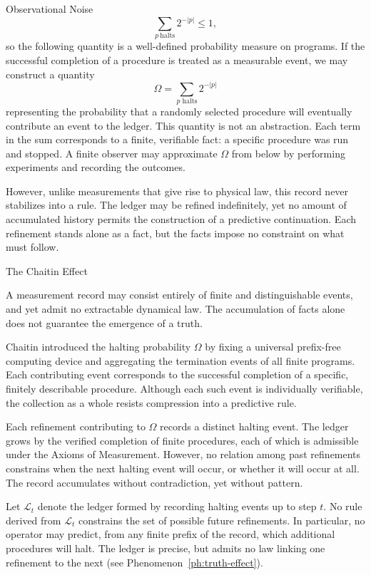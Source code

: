 \begin{coda}{Observational Noise}
\begin{equation}
\sum_{p\ \text{halts}} 2^{-|p|}\le 1,
\end{equation}
so the following quantity is a
well-defined probability measure on programs.
If the successful completion of a procedure is treated as a measurable
event, we may construct a quantity
\begin{equation}
\Omega = \sum_{p \text{ halts}} 2^{-|p|}
\end{equation}
representing the probability that a randomly selected procedure will
eventually contribute an event to the ledger. This quantity is not an
abstraction. Each term in the sum corresponds to a finite, verifiable
fact: a specific procedure was run and stopped. A finite observer may
approximate $\Omega$ from below by performing experiments and recording
the outcomes. 

However, unlike measurements that give rise to physical law, this record
never stabilizes into a rule. The ledger may be refined indefinitely,
yet no amount of accumulated history permits the construction of a
predictive continuation. Each refinement stands alone as a fact, but the
facts impose no constraint on what must follow.

\begin{phenom}{The Chaitin Effect~\cite{chaitin1975}}
\label{ph:chaitin-effect}

\PhStatement
A measurement record may consist entirely of finite and
distinguishable events, and yet admit no extractable dynamical law. The
accumulation of facts alone does not guarantee the emergence of a truth.

\PhOrigin
Chaitin introduced the halting probability $\Omega$ by fixing a universal
prefix-free computing device and aggregating the termination events of all
finite programs. Each contributing event corresponds to the successful
completion of a specific, finitely describable procedure. Although each such
event is individually verifiable, the collection as a whole resists
compression into a predictive rule.

\PhObservation
Each refinement contributing to $\Omega$ records a distinct halting event.
The ledger grows by the verified completion of finite procedures, each of which
is admissible under the Axioms of Measurement. However, no relation among past
refinements constrains when the next halting event will occur, or whether it
will occur at all. The record accumulates without contradiction, yet without
pattern.

\PhConstraint
Let $\mathcal{L}_t$ denote the ledger formed by recording halting events up to
step $t$. No rule derived from $\mathcal{L}_t$ constrains the set of
possible future refinements. In particular, no operator may predict, from any
finite prefix of the record, which additional procedures will halt. The ledger
is precise, but admits no law linking one refinement to the next (see
Phenomenon~\ref{ph:truth-effect}).


\end{phenom}
\end{coda}
